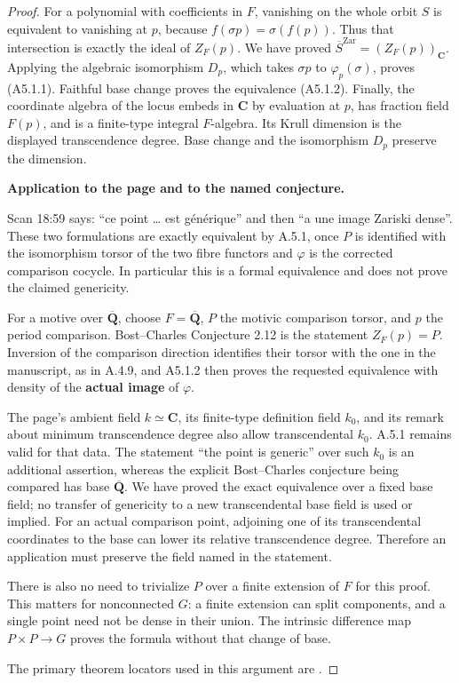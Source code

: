 \begin{proof}
For a polynomial with coefficients in \(F\), vanishing on the whole orbit
\(S\) is equivalent to vanishing at \(p\), because
\(f(\sigma p)=\sigma(f(p))\). Thus that intersection is exactly the ideal
of \(Z_F(p)\). We have proved
\(\overline{S}^{\mathrm{Zar}}=(Z_F(p))_{\mathbf C}\). Applying the
algebraic isomorphism \(D_p\), which takes \(\sigma p\) to
\(\varphi_p(\sigma)\), proves (A5.1.1). Faithful base change proves the
equivalence (A5.1.2). Finally, the coordinate algebra of the locus embeds
in \(\mathbf C\) by evaluation at \(p\), has fraction field \(F(p)\),
and is a finite-type integral \(F\)-algebra. Its Krull dimension is the
displayed transcendence degree. Base change and the isomorphism \(D_p\)
preserve the dimension.

\textbf{Application to the page and to the named conjecture.}

Scan 18:59 says: ``ce point \ldots{} est générique'' and then ``a une image Zariski
dense''. These two formulations are exactly equivalent by A.5.1, once
\(P\) is identified with the isomorphism torsor of the two fibre functors
and \(\varphi\) is the corrected comparison cocycle. In particular this
is a formal equivalence and does not prove the claimed genericity.

For a motive over \(\overline{\mathbf Q}\), choose \(F=\overline{
\mathbf Q}\), \(P\) the motivic comparison torsor, and \(p\) the period
comparison. Bost--Charles Conjecture 2.12 is the statement
\(Z_F(p)=P\). Inversion of the comparison direction identifies their
torsor with the one in the manuscript, as in A.4.9, and A5.1.2 then proves
the requested equivalence with density of the \textbf{actual image} of
\(\varphi\).

The page's ambient field \(k\simeq\mathbf C\), its finite-type
definition field \(k_0\), and its remark about minimum transcendence degree
also allow transcendental \(k_0\). A.5.1 remains valid for that data. The
statement ``the point is generic'' over such \(k_0\) is an additional
assertion, whereas the explicit Bost--Charles conjecture being compared
has base \(\overline{\mathbf Q}\). We have proved the exact equivalence
over a fixed base field; no transfer of genericity to a new transcendental
base field is used or implied. For an actual comparison point, adjoining
one of its transcendental coordinates to the base can lower its relative
transcendence degree. Therefore an application must preserve the field
named in the statement.

There is also no need to trivialize \(P\) over a finite extension of
\(F\) for this proof. This matters for nonconnected \(G\): a finite
extension can split components, and a single point need not be dense in
their union. The intrinsic difference map \(P\times P\to G\) proves
the formula without that change of base.

The primary theorem locators used in this argument are \cite[Definitions 2.3 and 2.9; Conjecture 2.12]{GenBostCharles}.
\end{proof}


